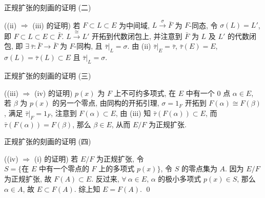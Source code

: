 
\begin{frame}{正规扩张的刻画的证明 (二)}

\startproof[bg=yellow, fg=red]((ii) $\Longrightarrow$ (iii) 的证明)
若 $F \subset L \subset E$ 为中间域, $L \xrightarrow{\ \sigma\ } \bar{F}$
为 $F$-同态, 令 $\sigma(L) = L'$,
即 $F \subset L \subset E \subset \bar{F}$.
$L \xrightarrow{\ \cong\ } L'$ 开拓到代数闭包上,
并注意到 $\bar{F}$ 为 $L$ 及 $L'$ 的代数闭包,
即 $\exists\ \bar{\tau}: \bar{F} \to \bar{F}$ 为 $F$-同构, 且 $\bar{\tau}|_L = \sigma$.
由 (ii) $\bar{\tau}|_E = \bar{\tau}$, $\bar{\tau}(E) = E$,
$\sigma(L) = \bar{\tau}(L) \subset E$ 且 $\bar{\tau}|_L = \sigma$.

\end{frame}


\begin{frame}{正规扩张的刻画的证明 (三)}

\startproof[bg=yellow, fg=red]((iii) $\Longrightarrow$ (iv) 的证明)
$p(x)$ 为 $F$ 上不可约多项式, 在 $E$ 中有一个 0 点 $\alpha \in E$,
若 $\beta$ 为 $p(x)$ 的另一个零点, 由同构的开拓引理,
$\sigma = 1_F$ 开拓到 $F(\alpha) \cong F(\beta)$,
满足 $\bar{\tau}|_F = 1_F$, 注意到 $F(\alpha) \subset E$,
由 (iii) 知 $\bar{\tau}(F(\alpha)) \subset E$,
而 $\bar{\tau}(F(\alpha)) = F(\beta)$, 那么 $\beta \in E$,
从而 $E/F$ 为正规扩张.

\end{frame}


\begin{frame}{正规扩张的刻画的证明 (四)}

\startproof[bg=yellow, fg=red]((iv) $\Longrightarrow$ (i) 的证明)
若 $E/F$ 为正规扩张, 令 $S = \{ \text{在 } E \text{ 中有一个零点的 }
F \text{ 上的多项式 } p(x) \}$,
令 $S$ 的零点集为 $A$.
因为 $E/F$ 为正规扩张, 故 $F(A) \subset E$.
反过来, $\forall\ \alpha \in E$, $\alpha$ 的极小多项式 $p(x) \in S$,
那么 $\alpha \in A$, 故 $E \subset F(A)$.
综上知 $E = F(A)$.
\qed

\end{frame}


